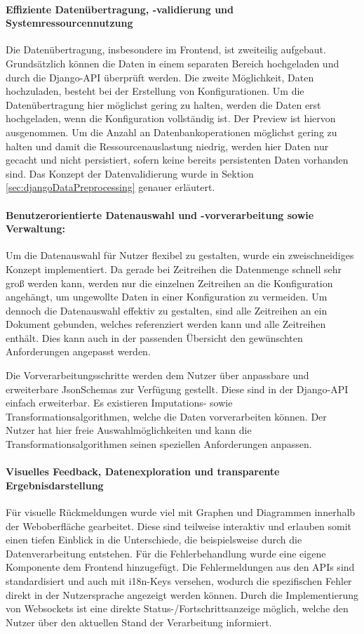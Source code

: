 \paragraph*{Effiziente Datenübertragung, -validierung und Systemressourcennutzung}
Die Datenübertragung, insbesondere im Frontend, ist zweiteilig aufgebaut. Grundsätzlich können die Daten in einem separaten Bereich hochgeladen und durch die Django-API überprüft werden. 
Die zweite Möglichkeit, Daten hochzuladen, besteht bei der Erstellung von Konfigurationen. Um die Datenübertragung hier möglichst gering zu halten, werden die Daten erst hochgeladen, wenn die Konfiguration vollständig ist. Der Preview ist hiervon ausgenommen.
Um die Anzahl an Datenbankoperationen möglichst gering zu halten und damit die Ressourcenauslastung niedrig, werden hier Daten nur gecacht und nicht persistiert, sofern keine bereits persistenten Daten vorhanden sind.
Das Konzept der Datenvalidierung wurde in Sektion \ref{sec:djangoDataPreprocessing} genauer erläutert.

\paragraph*{Benutzerorientierte Datenauswahl und -vorverarbeitung sowie Verwaltung:}
Um die Datenauswahl für Nutzer flexibel zu gestalten, wurde ein zweischneidiges Konzept implementiert. 
Da gerade bei Zeitreihen die Datenmenge schnell sehr groß werden kann, werden nur die einzelnen Zeitreihen an die Konfiguration angehängt, um ungewollte Daten in einer Konfiguration zu vermeiden.
Um dennoch die Datenauswahl effektiv zu gestalten, sind alle Zeitreihen an ein Dokument gebunden, welches referenziert werden kann und alle Zeitreihen enthält. Dies kann auch in der passenden Übersicht den gewünschten Anforderungen angepasst werden.

Die Vorverarbeitungsschritte werden dem Nutzer über anpassbare und erweiterbare JsonSchemas zur Verfügung gestellt. Diese sind in der Django-API einfach erweiterbar.
Es existieren Imputations- sowie Transformationsalgorithmen, welche die Daten vorverarbeiten können. Der Nutzer hat hier freie Auswahlmöglichkeiten und kann die Transformationsalgorithmen seinen speziellen Anforderungen anpassen.

\paragraph*{Visuelles Feedback, Datenexploration und transparente Ergebnisdarstellung}
Für visuelle Rückmeldungen wurde viel mit Graphen und Diagrammen innerhalb der Weboberfläche gearbeitet. Diese sind teilweise interaktiv und erlauben somit einen tiefen Einblick in die Unterschiede, 
die beispielsweise durch die Datenverarbeitung entstehen.
Für die Fehlerbehandlung wurde eine eigene Komponente dem Frontend hinzugefügt. Die Fehlermeldungen aus den APIs sind standardisiert und auch mit i18n-Keys versehen, wodurch die spezifischen Fehler direkt in der Nutzersprache angezeigt werden können.
Durch die Implementierung von Websockets ist eine direkte Status-/Fortschrittsanzeige möglich, welche den Nutzer über den aktuellen Stand der Verarbeitung informiert.


